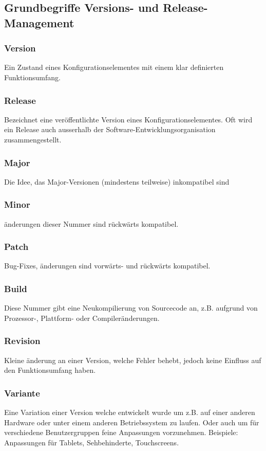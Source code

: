 \documentclass[10pt]{article}
\begin{document}
    \subsection{Grundbegriffe Versions- und Release-Management}
    \subsubsection{Version}
    Ein Zustand eines Konfigurationselementes mit einem klar definierten Funktionsumfang.
    \subsubsection{Release}
    Bezeichnet eine ver\"offentlichte Version eines Konfigurationselementes. Oft wird ein Release auch ausserhalb der Software-Entwicklungsorganisation zusammengestellt.
    \subsubsection{Major}
    Die Idee, das Major-Versionen (mindestens teilweise) inkompatibel sind
    \subsubsection{Minor}
    \"anderungen dieser Nummer sind r\"uckw\"arts kompatibel.
    \subsubsection{Patch}
    Bug-Fixes, \"anderungen sind vorw\"arts- und r\"uckw\"arts kompatibel.
    \subsubsection{Build}
    Diese Nummer gibt eine Neukompilierung von Sourcecode an, z.B. aufgrund von Prozessor-, Plattform- oder Compiler\"anderungen.
    \subsubsection{Revision}
    Kleine \"anderung an einer Version, welche Fehler behebt, jedoch keine Einfluss auf den Funktionsumfang haben.
    \subsubsection{Variante}
    Eine Variation einer Version welche entwickelt wurde um z.B. auf einer anderen Hardware oder unter einem anderen Betriebssystem zu laufen. Oder auch um f\"ur verschiedene Benutzergruppen feine Anpassungen vorzunehmen. Beispiele: Anpassungen f\"ur Tablets, Sehbehinderte, Touchscreens.
\end{document}
